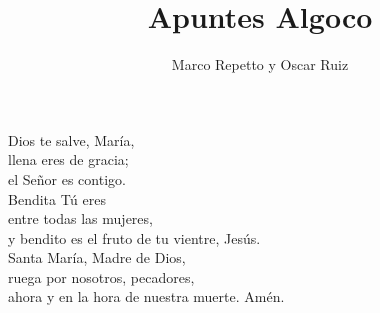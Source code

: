\documentclass{article}
\title{Apuntes Algoco}
\author{Marco Repetto y Oscar Ruiz}
\date{}
\begin{document}
\maketitle


\vspace*{\fill} %
\begin{center}
{\Large %
Dios te salve, María, \\
llena eres de gracia; \\
el Señor es contigo. \\
Bendita Tú eres \\
entre todas las mujeres, \\
y bendito es el fruto de tu vientre, Jesús. \\
Santa María, Madre de Dios, \\
ruega por nosotros, pecadores, \\
ahora y en la hora de nuestra muerte. Amén.
}
\end{center}
\vspace*{\fill} %
\newpage
\tableofcontents







\newpage







\end{document}
